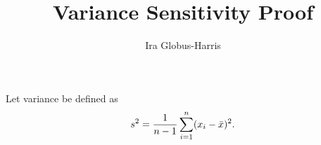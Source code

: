 \documentclass[11pt, oneside]{article}   	%
\title{Variance Sensitivity Proof}
\author{Ira Globus-Harris}
\begin{document}
\maketitle

\begin{definition}
Let variance be defined as 
$$ s^2 = \frac{1}{n-1} \sum_{i=1}^n (x_i - \bar{x})^2.$$
\end{definition}

%


%
\end{document}
